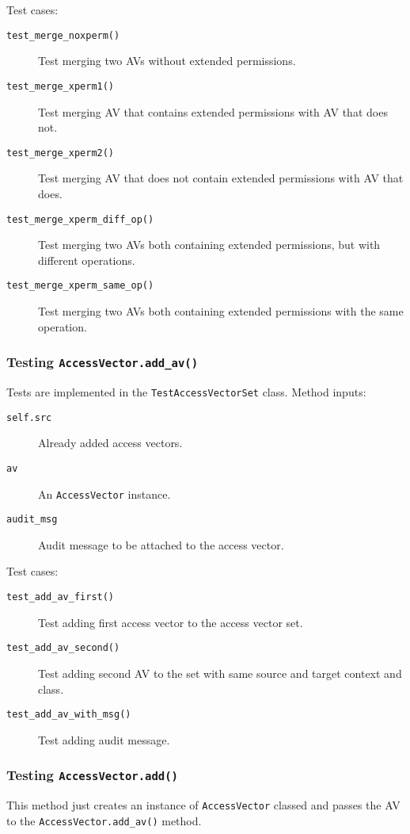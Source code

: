 Test cases:
\begin{description}
    \item [\texttt{test\_merge\_noxperm()}] Test merging two AVs without
        extended permissions.
    \item [\texttt{test\_merge\_xperm1()}] Test merging AV that contains
        extended permissions with AV that does not.
    \item [\texttt{test\_merge\_xperm2()}] Test merging AV that does not contain
        extended permissions with AV that does.
    \item [\texttt{test\_merge\_xperm\_diff\_op()}] Test merging two AVs both
        containing extended permissions, but with different operations.
    \item [\texttt{test\_merge\_xperm\_same\_op()}] Test merging two AVs both
        containing extended permissions with the same operation.
\end{description}

\subsubsection{Testing \texttt{AccessVector.add\_av()}}
Tests are implemented in the \texttt{TestAccessVectorSet} class. Method inputs:
\begin{description}
    \item [\texttt{self.src}] Already added access vectors.
    \item [\texttt{av}] An \texttt{AccessVector} instance.
    \item [\texttt{audit\_msg}] Audit message to be attached to the access
        vector.
\end{description}

Test cases:
\begin{description}
    \item [\texttt{test\_add\_av\_first()}] Test adding first access vector to
        the access vector set.
    \item [\texttt{test\_add\_av\_second()}] Test adding second AV to the set
        with same source and target context and class.
    \item [\texttt{test\_add\_av\_with\_msg()}] Test adding audit message.
\end{description}

\subsubsection{Testing \texttt{AccessVector.add()}}
This method just creates an instance of \texttt{AccessVector} classed and passes
the AV to the \texttt{AccessVector.add\_av()} method.

